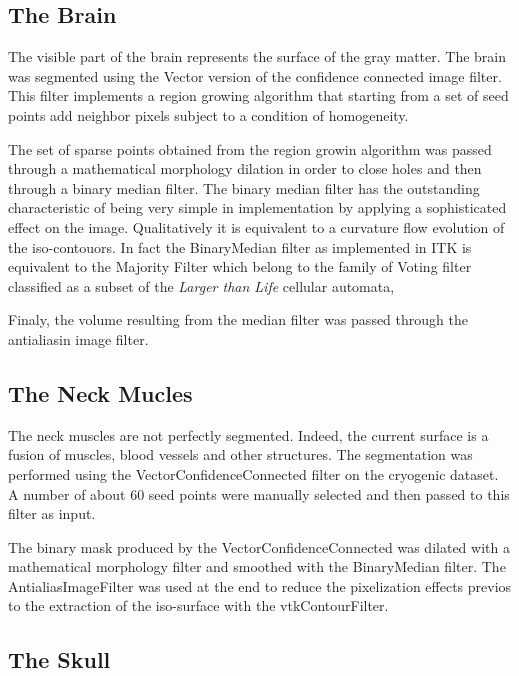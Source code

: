 \subsection*{The Brain}

The visible part of the brain represents the surface of the gray matter.  The
brain was segmented using the Vector version of the confidence connected image
filter.  This filter implements a region growing algorithm that starting from a
set of seed points add neighbor pixels subject to a condition of homogeneity.

The set of sparse points obtained from the region growin algorithm was passed
through a mathematical morphology dilation in order to close holes and then
through a binary median filter. The binary median filter has the outstanding
characteristic of being very simple in implementation by applying a
sophisticated effect on the image. Qualitatively it is equivalent to a
curvature flow evolution of the iso-contouors. In fact the BinaryMedian filter
as implemented in ITK is equivalent to the Majority Filter which belong to the
family of Voting filter classified as a subset of the \emph{Larger than Life}
cellular automata, 

Finaly, the volume resulting from the median filter was passed through the 
antialiasin image filter.


\subsection*{The Neck Mucles}

The neck muscles are not perfectly segmented. Indeed, the current surface is a
fusion of muscles, blood vessels and other structures. The segmentation was
performed using the VectorConfidenceConnected filter on the cryogenic dataset.
A number of about 60 seed points were manually selected and then passed to this
filter as input.

The binary mask produced by the VectorConfidenceConnected was dilated with a 
mathematical morphology filter and smoothed with the BinaryMedian filter. The 
AntialiasImageFilter was used at the end to reduce the pixelization effects
previos to the extraction of the iso-surface with the vtkContourFilter.  



\subsection*{The Skull}

